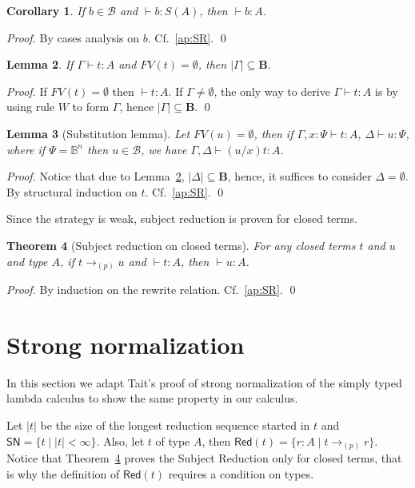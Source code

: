 \documentclass[preprint]{elsarticle}
\newtheorem{theorem}{Theorem}[section]
\newtheorem{lemma}[theorem]{Lemma}
\newtheorem{corollary}[theorem]{Corollary}
\newcommand\Red[1]{\mathsf{Red}(#1)}
\newcommand\SN{\mathsf{SN}}
\newcommand\lra[1][1]{\longrightarrow_{\left(#1\right)}}
\newcommand\lrap{\lra[p]}
\newcommand\B{\ensuremath{\mathbb B}}
\newcommand\gB{\ensuremath{\Psi}}
\newcommand\bqtypes{\ensuremath{\mathbf B}}
\newcommand\basis{\ensuremath{\mathcal B}}
\begin{document}
\begin{corollary}
  \label{cor:basisTermNoSup}
  If $b\in\basis$ and $\vdash b:S(A)$, then $\vdash b:A$.
\end{corollary}
\begin{proof}
  By cases analysis on $b$. Cf.~\ref{ap:SR}. \qed
\end{proof}

\begin{lemma}
  \label{lem:linearContext}
  If $\Gamma\vdash t:A$ and $FV(t)=\emptyset$, then $|\Gamma|\subseteq\bqtypes$.
\end{lemma}
\begin{proof}
  If $FV(t)=\emptyset$ then $\vdash t:A$. If $\Gamma\neq\emptyset$, the only way
  to derive $\Gamma\vdash t:A$ is by using rule $W$ to form $\Gamma$, hence
  $|\Gamma|\subseteq\bqtypes$.
  \qed
\end{proof}

\begin{lemma}[Substitution lemma]\label{lem:substitution}
  Let $FV(u)=\emptyset$, then if $\Gamma,x:\gB\vdash t:A$, $\Delta\vdash u:\gB$,
  where if $\gB=\B^n$ then $u\in\basis$, we have $\Gamma,\Delta\vdash (u/x)t:A$.
\end{lemma}
\begin{proof}
  Notice that due to Lemma~\ref{lem:linearContext}, $|\Delta|\subseteq\bqtypes$,
  hence, it suffices to consider $\Delta=\emptyset$. By structural
  induction on $t$. Cf.~\ref{ap:SR}.
  \qed
\end{proof}

Since the strategy is weak, subject reduction is proven for closed terms.

\begin{theorem}
  [Subject reduction on closed terms]
  \label{thm:SR}
  For any closed terms $t$ and $u$ and type $A$, if $t\lra[p] u$ and $\vdash
  t:A$, then $\vdash u:A$.
\end{theorem}
\begin{proof}
  By induction on the rewrite relation. Cf.~\ref{ap:SR}.
  \qed
\end{proof}

\section{Strong normalization}\label{sec:SN}
In this section we adapt Tait's proof of strong normalization of the simply
typed lambda calculus to show the same property in our calculus.

Let $|t|$ be the size of the longest reduction sequence started in $t$ and
$\SN=\{t\mid |t|<\infty\}$. Also, let $t$ of type $A$, then $\Red t=\{r:A\mid
t\lrap r\}$. Notice that Theorem~\ref{thm:SR} proves the Subject Reduction only
for closed terms, that is why the definition of $\Red t$ requires a condition on types.
\end{document}
